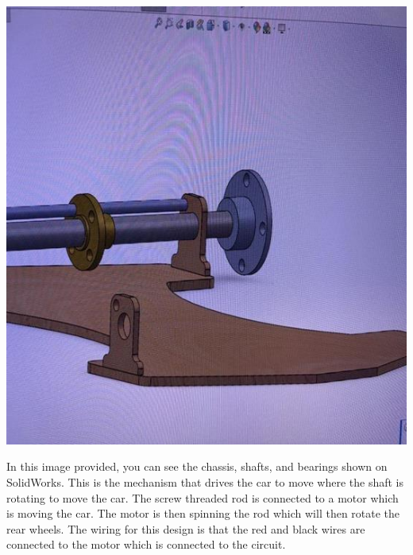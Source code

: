 \documentclass{article}
\begin{document}
\begin{minipage}{0.4\textwidth}
	\centering
	\includegraphics[width=1\textwidth]{extracted_images2/image_9_3.png}
\end{minipage}\hfil
\begin{minipage}{0.55\textwidth}
In this image provided, you can see the chassis, shafts, and bearings shown on SolidWorks. This is the mechanism that drives the car to move where the shaft is rotating to move the car. The screw threaded rod is connected to a motor which is moving the car. The motor is then spinning the rod which will then rotate the rear wheels. The wiring for this design is that the red and black wires are connected to the motor which is connected to the circuit. 
\end{minipage}


\newpage{}
\end{document}
